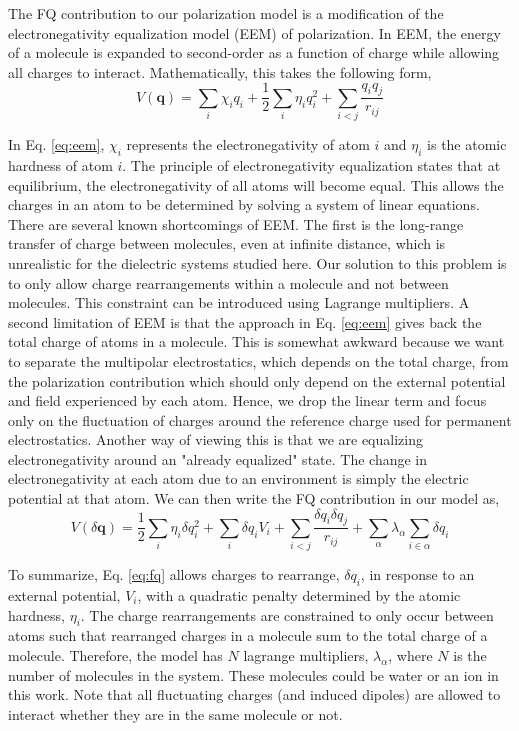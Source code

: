 \documentclass[journal=jacsat,manuscript=article]{achemso}
\begin{document}
The FQ contribution to our polarization model is a modification of the electronegativity
equalization model (EEM) of polarization.\cite{mortier1986electronegativity} In EEM,
the energy of a molecule is expanded to second-order as a function of charge while allowing
all charges to interact. Mathematically, this takes the following form,
\begin{equation}
  V(\bm{q})=\sum_i \chi_i q_i + \frac12 \sum_i \eta_i q_i^2 + \sum_{i<j} \frac{q_i q_j}{r_{ij}}
  \label{eq:eem}
\end{equation}

In Eq. \ref{eq:eem}, $\chi_i$ represents the electronegativity of atom $i$ and
$\eta_i$ is the atomic hardness of atom $i$. The principle of electronegativity
equalization states that  at equilibrium, the electronegativity of all atoms
will become equal. This allows the charges in an atom to be determined by solving
a system of linear equations. There are several known shortcomings of EEM. The first
is the long-range transfer of charge between molecules, even at infinite distance,
which is unrealistic for the dielectric systems studied here.\cite{chen2007qtpie,chen2008unified}
Our solution to this problem is to only allow charge rearrangements within
a molecule and not between molecules. This constraint can be introduced using
Lagrange multipliers. A second limitation of EEM is that the approach in Eq. \ref{eq:eem}
gives back the total charge of atoms in a molecule. This is somewhat awkward because
we want to separate the multipolar electrostatics, which depends on the total charge,
from the polarization contribution which should only depend on the external potential
and field experienced by each atom. Hence, we drop the linear term and focus only on the
fluctuation of charges around the reference charge used for permanent electrostatics.
Another way of viewing this is that we are equalizing electronegativity around an "already
equalized" state. The change in electronegativity at each atom due to an environment is simply
the electric potential at that atom. We can then write the FQ contribution in our
model as,
\begin{equation}
  V(\delta \bm{q})=\frac12\sum_i \eta_i \delta q_i^2 + \sum_i \delta q_i V_i + \sum_{i<j}\frac{\delta q_i \delta q_j}{r_{ij}} + \sum_{\alpha}\lambda_\alpha \sum_{i\in\alpha}\delta q_{i}
  \label{eq:fq}
\end{equation}

To summarize, Eq. \ref{eq:fq} allows charges to rearrange, $\delta q_i$, in response to an external
potential, $V_i$, with a quadratic penalty determined by the atomic hardness, $\eta_i$.
The charge rearrangements are constrained to only occur between atoms such that rearranged
charges in a molecule sum to the total charge of a molecule. Therefore, the model has $N$ lagrange
multipliers, $\lambda_\alpha$, where $N$ is the number of molecules in the system. These molecules
could be water or an ion in this work. Note that all fluctuating charges (and induced
dipoles) are allowed to interact whether they are in the same molecule or not.
\end{document}
